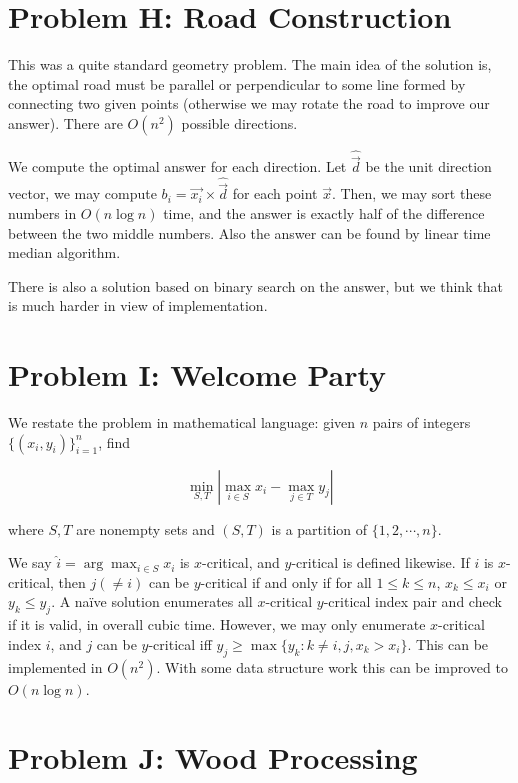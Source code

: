 \documentclass[a4paper,10.5pt,twoside]{article}
\begin{document}
\section*{Problem H: Road Construction}

This was a quite standard geometry problem. The main idea of the solution is, the optimal road must be parallel or perpendicular to some line formed by connecting two given points (otherwise we may rotate the road to improve our answer). There are $O(n^2)$ possible directions.

We compute the optimal answer for each direction. Let $\hat{\vec{d}}$ be the unit direction vector, we may compute $b_i = \vec{x_i} \times \hat{\vec{d}}$ for each point $\vec{x}$. Then, we may sort these numbers in $O(n \log n)$ time, and the answer is exactly half of the difference between the two middle numbers. Also the answer can be found by linear time median algorithm.

There is also a solution based on binary search on the answer, but we think that is much harder in view of implementation.

\section*{Problem I: Welcome Party}
 
We restate the problem in mathematical language: given $n$ pairs of integers $\{(x_i, y_i)\}_{i=1}^n$, find

$$ \min_{S, T} | \max_{i \in S} x_i - \max_{j \in T} y_j | $$

where $S, T$ are nonempty sets and $(S, T)$ is a partition of $\{1, 2, \cdots, n\}$.

We say $\hat{i} = \arg\max_{i \in S} x_i$ is $x$-critical, and $y$-critical is defined likewise. If $i$ is $x$-critical, then $j (\neq i)$ can be $y$-critical if and only if for all $1 \leq k \leq n$, $x_k \leq x_i$ or $y_k \leq y_j$. A na\"ive solution enumerates all $x$-critical $y$-critical index pair and check if it is valid, in overall cubic time. However, we may only enumerate $x$-critical index $i$, and $j$ can be $y$-critical iff $y_j \geq \max\{y_k : k \neq i, j, x_k > x_i\}$. This can be implemented in $O(n^2)$. With some data structure work this can be improved to $O(n \log n)$.

\section*{Problem J: Wood Processing}
\end{document}
